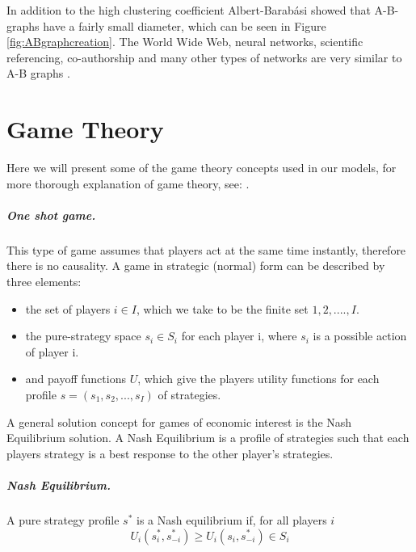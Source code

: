In addition to the high clustering coefficient Albert-Barabási showed that A-B-graphs have a fairly small diameter,
 which can be seen in Figure \ref{fig:ABgraphcreation}. 
The World Wide Web, neural networks, scientific referencing, co-authorship and many other types of networks are very similar to A-B graphs \cite{audestad}.

\section{Game Theory}
Here we will present some of the game theory concepts used in our models, for more thorough explanation of game theory, see: \cite{nisan2007algorithmic, watson2008strategy}.
\subparagraph{One shot game.}
This type of game assumes that players act at the same time instantly, therefore there is no causality. A game in strategic (normal) form can be described by three elements:
\begin{itemize}
\item the set of players $i \in I$, which we take to be the finite set ${1,2,....,I}$.
\item the pure-strategy space $s_{i}\in S_{i}$ for each player i, where $s_{i}$ is a possible action of player i.
\item and payoff functions $U$, which give the players utility functions for each profile $s=(s_{1},s_{2},...,s_{I})$ of strategies.
\end{itemize}
A general solution concept for games of economic interest is the Nash Equilibrium solution. A Nash Equilibrium is a profile of strategies such that each players strategy is a best response to the other player's strategies. 
\subparagraph{Nash Equilibrium.}
A pure strategy profile $s^{*}$ is a Nash equilibrium if, for all players $i$
\begin{equation}
U_{i}(s^{*}_{i},s_{-i}^{*})\geq U_{i}(s_{i},s^{*}_{-i}) \in S_{i}
\end{equation}

